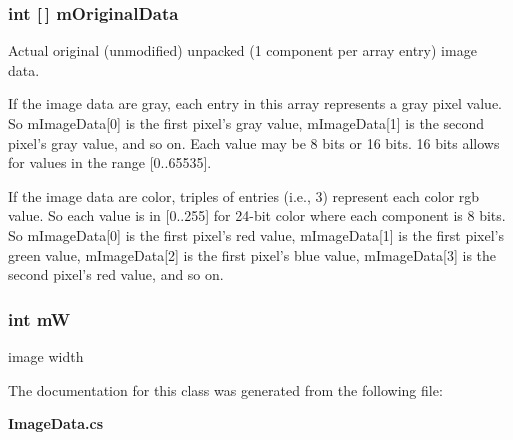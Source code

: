 \subsubsection{\setlength{\rightskip}{0pt plus 5cm}int [$\,$] {\bf m\-Original\-Data}\hspace{0.3cm}{\tt  [protected]}}\label{class_c_s_image_viewer_1_1_image_data_11d80308f1ea8f14ee0ea822696f4f97}


Actual original (unmodified) unpacked (1 component per array entry) image data. 

If the image data are gray, each entry in this array represents a gray pixel value. So m\-Image\-Data[0] is the first pixel's gray value, m\-Image\-Data[1] is the second pixel's gray value, and so on. Each value may be 8 bits or 16 bits. 16 bits allows for values in the range [0..65535]. \par
 \par
 If the image data are color, triples of entries (i.e., 3) represent each color rgb value. So each value is in [0..255] for 24-bit color where each component is 8 bits. So m\-Image\-Data[0] is the first pixel's red value, m\-Image\-Data[1] is the first pixel's green value, m\-Image\-Data[2] is the first pixel's blue value, m\-Image\-Data[3] is the second pixel's red value, and so on. 
\subsubsection{\setlength{\rightskip}{0pt plus 5cm}int {\bf m\-W}\hspace{0.3cm}{\tt  [protected]}}\label{class_c_s_image_viewer_1_1_image_data_b636a8ca59ea2d07827db0b24b129ccb}


image width 



The documentation for this class was generated from the following file:\begin{CompactItemize}
\item 
{\bf Image\-Data.cs}\end{CompactItemize}
